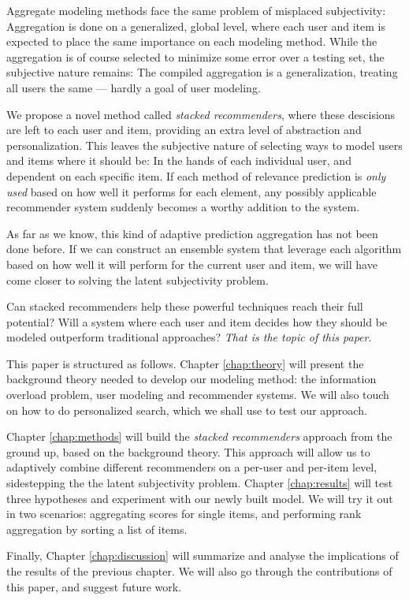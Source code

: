 Aggregate modeling methods face the same problem of misplaced subjectivity: 
Aggregation is done on a generalized, global level,
where each user and item is expected to place the same importance on each modeling method.
While the aggregation is of course selected to minimize some error over a testing set,
the subjective nature remains: The compiled aggregation is a generalization,
treating all users the same --- hardly a goal of user modeling.

We propose a novel method called \emph{stacked recommenders}, where these descisions are left to each user and item,
providing an extra level of abstraction and personalization.
This leaves the subjective nature of selecting ways to model users and items where it should be:
In the hands of each individual user, and dependent on each specific item.
If each method of relevance prediction is \emph{only used} based on how well it performs for each element,
any possibly applicable recommender system suddenly becomes a worthy addition to the system.

As far as we know, this kind of adaptive prediction aggregation has not been done before.
If we can construct an ensemble system that leverage each algorithm
based on how well it will perform for the current user and item,
we will have come closer to solving the latent subjectivity problem.

Can stacked recommenders help these powerful techniques reach their full potential?
Will a system where each user and item decides how they should be modeled outperform traditional approaches?
\emph{That is the topic of this paper}.


\hr


This paper is structured as follows.
Chapter \ref{chap:theory} will present the background theory needed to develop our modeling method:
the information overload problem, user modeling and recommender systems. We will also touch on
how to do personalized search, which we shall use to test our approach.

Chapter \ref{chap:methods} will build the \emph{stacked recommenders} approach from the ground up,
based on the background theory.
This approach will allow us to adaptively combine different recommenders
on a per-user and per-item level, sidestepping the the latent subjectivity problem.
Chapter \ref{chap:results} will test three hypotheses and experiment with our newly built model.
We will try it out in two scenarios:
aggregating scores for single items, and performing rank aggregation by sorting a list of items.

Finally, Chapter \ref{chap:discussion} will summarize and analyse the implications of 
the results of the previous chapter.
We will also go through the contributions of this paper, and suggest future work.



